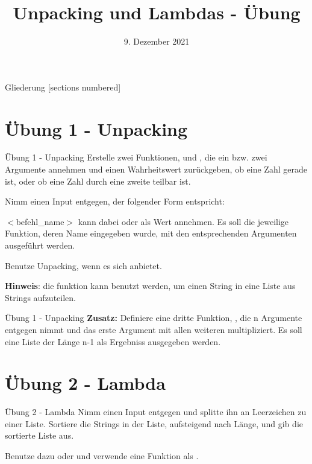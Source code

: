 



\title{Unpacking und Lambdas - Übung}
\date{9. Dezember 2021}


\maketitle

\begin{frame}{Gliederung}
	[sections numbered]
	\tableofcontents
\end{frame}

\section{Übung 1 - Unpacking}
\begin{frame}{Übung 1 - Unpacking}
	Erstelle zwei Funktionen,  und , die ein bzw. zwei Argumente annehmen und einen Wahrheitswert zurückgeben, ob eine Zahl gerade ist, oder ob eine Zahl durch eine zweite teilbar ist.
	
	Nimm einen Input entgegen, der folgender Form entspricht:
	
	
	$<$befehl\_name$>$ kann dabei  oder  als Wert annehmen.
	Es soll die jeweilige Funktion, deren Name eingegeben wurde, mit den entsprechenden Argumenten ausgeführt werden.
	
	Benutze \alert{Unpacking}, wenn es sich anbietet.
	
	\textbf{Hinweis}: die  funktion kann benutzt werden, um einen String in eine Liste aus Strings aufzuteilen.
\end{frame}
\begin{frame}{Übung 1 - Unpacking}
	\textbf{Zusatz:}
	Definiere eine dritte Funktion, , die n Argumente entgegen nimmt und das erste Argument mit allen weiteren multipliziert. Es soll eine Liste der Länge n-1 als Ergebniss ausgegeben werden.
\end{frame}

\section{Übung 2 - Lambda}
\begin{frame}{Übung 2 - Lambda}
	Nimm einen Input entgegen und splitte ihn an Leerzeichen zu einer Liste. Sortiere die Strings in der Liste, aufsteigend nach Länge, und gib die sortierte Liste aus.

	Benutze dazu  oder  und verwende eine  Funktion als .
\end{frame}


